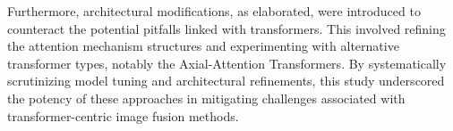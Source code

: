 Furthermore, architectural modifications, as elaborated, were introduced to counteract the potential pitfalls linked with transformers. This involved refining the attention mechanism structures and experimenting with alternative transformer types, notably the Axial-Attention Transformers. By systematically scrutinizing model tuning and architectural refinements, this study underscored the potency of these approaches in mitigating challenges associated with transformer-centric image fusion methods.
